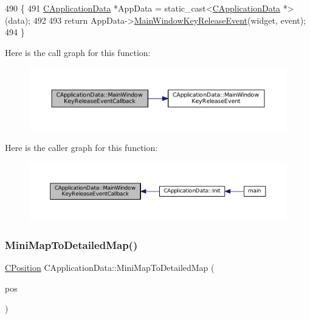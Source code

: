 \begin{DoxyCode}
490                                                                                                            
           \{
491     \hyperlink{classCApplicationData}{CApplicationData} *AppData = \textcolor{keyword}{static\_cast<}\hyperlink{classCApplicationData}{CApplicationData} *\textcolor{keyword}{>}(data);
492 
493     \textcolor{keywordflow}{return} AppData->\hyperlink{classCApplicationData_aff9f46bccd458a0dcca968e4a46c7d9b}{MainWindowKeyReleaseEvent}(widget, event);
494 \}
\end{DoxyCode}
Here is the call graph for this function\+:\nopagebreak
\begin{figure}[H]
\begin{center}
\leavevmode
\includegraphics[width=350pt]{classCApplicationData_a4b2c76db5c2efd75404502e36700f99b_cgraph}
\end{center}
\end{figure}
Here is the caller graph for this function\+:\nopagebreak
\begin{figure}[H]
\begin{center}
\leavevmode
\includegraphics[width=350pt]{classCApplicationData_a4b2c76db5c2efd75404502e36700f99b_icgraph}
\end{center}
\end{figure}
\hypertarget{classCApplicationData_a3dabde94ddec0eb2c732525f54164bc5}{}\label{classCApplicationData_a3dabde94ddec0eb2c732525f54164bc5} 
\subsubsection{\texorpdfstring{Mini\+Map\+To\+Detailed\+Map()}{MiniMapToDetailedMap()}}
{\footnotesize\ttfamily \hyperlink{classCPosition}{C\+Position} C\+Application\+Data\+::\+Mini\+Map\+To\+Detailed\+Map (\begin{DoxyParamCaption}\item[{const \hyperlink{classCPosition}{C\+Position} \&}]{pos }\end{DoxyParamCaption})\hspace{0.3cm}{\ttfamily [protected]}}



